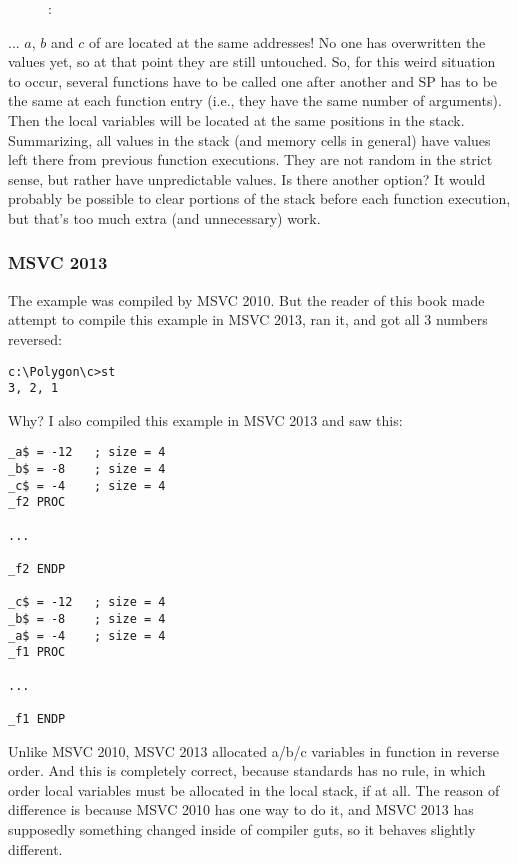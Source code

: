 \begin{figure}[H]
\centering
{}
\caption{\olly: }
\label{fig:stack_noise_olly2}
\end{figure}

... $a$, $b$ and $c$ of  are located at the same addresses!
No one has overwritten the values yet, so at that point they are still untouched.
So, for this weird situation to occur, several functions have to be called one after another and
\ac{SP} has to be the same at each function entry (i.e., they have the same number
of arguments). Then the local variables will be located at the same positions in the stack.
Summarizing, all values in the stack (and memory cells in general) have values left there from previous function executions.
They are not random in the strict sense, but rather have unpredictable values.
Is there another option?
It would probably be possible to clear portions of the stack before each function execution,
but that's too much extra (and unnecessary) work.

\subsubsection{MSVC 2013}

The example was compiled by MSVC 2010.
But the reader of this book made attempt to compile this example in MSVC 2013, ran it, and got all 3 numbers reversed:%

\begin{lstlisting}
c:\Polygon\c>st
3, 2, 1
\end{lstlisting}

Why?
I also compiled this example in MSVC 2013 and saw this:


\begin{lstlisting}[caption=MSVC 2013]
_a$ = -12	; size = 4
_b$ = -8	; size = 4
_c$ = -4	; size = 4
_f2	PROC

...

_f2	ENDP

_c$ = -12	; size = 4
_b$ = -8	; size = 4
_a$ = -4	; size = 4
_f1	PROC

...

_f1	ENDP
\end{lstlisting}

Unlike MSVC 2010, MSVC 2013 allocated a/b/c variables in function  in reverse order.%
And this is completely correct, because \CCpp standards has no rule, in which order local variables must be allocated in the local stack, if at all.
The reason of difference is because MSVC 2010 has one way to do it, and MSVC 2013 has supposedly something changed inside of compiler guts, so it behaves slightly different.

